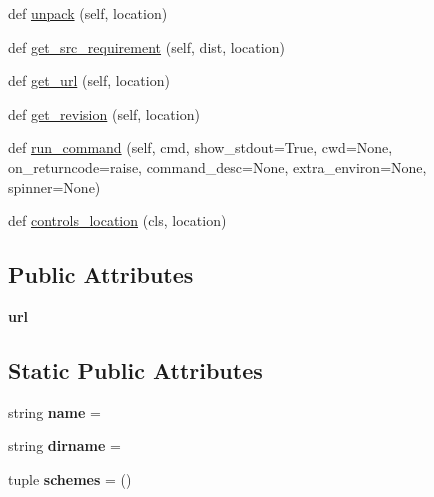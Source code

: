 \begin{DoxyCompactItemize}
def \hyperlink{classpip_1_1vcs_1_1_version_control_ab6172a920a48d0638cf2f221b54f1124}{unpack} (self, location)
\item 
def \hyperlink{classpip_1_1vcs_1_1_version_control_a64a95652b5a508334ef46084a02157b9}{get\+\_\+src\+\_\+requirement} (self, dist, location)
\item 
def \hyperlink{classpip_1_1vcs_1_1_version_control_a3eed659ef15a7669b94b9c378b23fbdf}{get\+\_\+url} (self, location)
\item 
def \hyperlink{classpip_1_1vcs_1_1_version_control_a59243c7bceb232201184a0d394e67ff7}{get\+\_\+revision} (self, location)
\item 
def \hyperlink{classpip_1_1vcs_1_1_version_control_a518028a938e11a2ab6122766d14105c5}{run\+\_\+command} (self, cmd, show\+\_\+stdout=True, cwd=None, on\+\_\+returncode=\textquotesingle{}raise\textquotesingle{}, command\+\_\+desc=None, extra\+\_\+environ=None, spinner=None)
\item 
def \hyperlink{classpip_1_1vcs_1_1_version_control_a8b5a21faac927f865446fd09e7791dca}{controls\+\_\+location} (cls, location)
\end{DoxyCompactItemize}
\subsection*{Public Attributes}
\begin{DoxyCompactItemize}
\item 
\mbox{\label{classpip_1_1vcs_1_1_version_control_a46321a1248c30f1d20d721068f626274}} 
{\bfseries url}
\end{DoxyCompactItemize}
\subsection*{Static Public Attributes}
\begin{DoxyCompactItemize}
\item 
\mbox{\label{classpip_1_1vcs_1_1_version_control_a615373a1bcd32afb17cf6943b2443a84}} 
string {\bfseries name} = \textquotesingle{}\textquotesingle{}
\item 
\mbox{\label{classpip_1_1vcs_1_1_version_control_a52ee08e2ab5b4e3be92292c115dc941b}} 
string {\bfseries dirname} = \textquotesingle{}\textquotesingle{}
\item 
\mbox{\label{classpip_1_1vcs_1_1_version_control_a18b70bde567113d1aca8d5245ca0afca}} 
tuple {\bfseries schemes} = ()
\end{DoxyCompactItemize}


